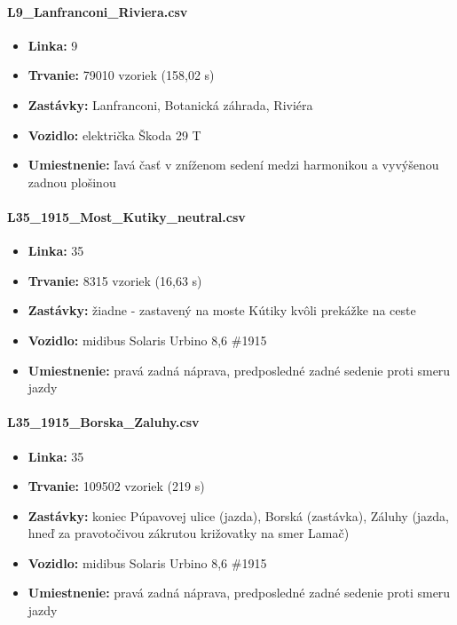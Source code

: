 \paragraph{L9\_Lanfranconi\_Riviera.csv}
\begin{itemize}[noitemsep, topsep=0pt]
  	\item \textbf{Linka:} 9
  	\item \textbf{Trvanie:} 79010 vzoriek (158,02 s)
  	\item \textbf{Zastávky:} Lanfranconi, Botanická záhrada, Riviéra
  	\item \textbf{Vozidlo:} električka Škoda 29 T
  	\item \textbf{Umiestnenie:} ľavá časť v zníženom sedení medzi harmonikou a vyvýšenou zadnou plošinou
\end{itemize}
  	
\paragraph{L35\_1915\_Most\_Kutiky\_neutral.csv}
	\begin{itemize}[noitemsep, topsep=0pt]
  	\item \textbf{Linka:} 35
  	\item \textbf{Trvanie:} 8315 vzoriek (16,63 s)
  	\item \textbf{Zastávky:} žiadne - zastavený na moste Kútiky kvôli prekážke na ceste
  	\item \textbf{Vozidlo:} midibus Solaris Urbino 8,6 \#1915
  	\item \textbf{Umiestnenie:} pravá zadná náprava, predposledné zadné sedenie proti smeru jazdy
  	\end{itemize}
\paragraph{L35\_1915\_Borska\_Zaluhy.csv}
	\begin{itemize}[noitemsep, topsep=0pt]
  	\item \textbf{Linka:} 35
  	\item \textbf{Trvanie:} 109502 vzoriek (219 s)
  	\item \textbf{Zastávky:} koniec Púpavovej ulice (jazda), Borská (zastávka), Záluhy (jazda, hneď za pravotočivou zákrutou križovatky na smer Lamač)
  	\item \textbf{Vozidlo:} midibus Solaris Urbino 8,6 \#1915
  	\item \textbf{Umiestnenie:} pravá zadná náprava, predposledné zadné sedenie proti smeru jazdy
  	\end{itemize}
 
